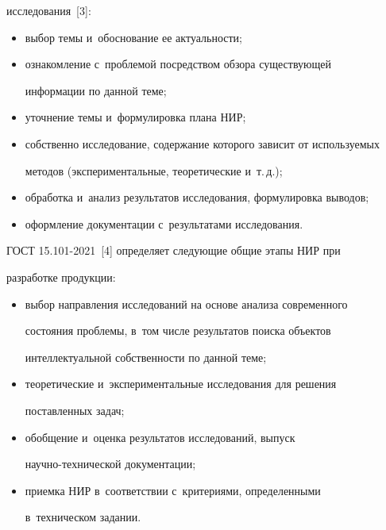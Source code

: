 исследования~[3]:


  \begin{itemize}


\item выбор темы и~обоснование ее ак\-ту\-аль\-ности;


\item ознакомление с~проблемой посредством обзора су\-щест\-ву\-ющей 


информации по данной \mbox{теме};


\item уточнение темы и~формулировка плана   НИР;


\item собственно исследование, содержание которого зависит от ис\-поль\-зу\-емых 


методов (экспериментальные, тео\-ре\-ти\-че\-ские и~т.\,д.);


\item обработка и~анализ результатов исследования, формулировка выводов;


\item оформление документации с~результатами исследования.


\end{itemize}


  


  ГОСТ 15.101-2021~[4] определяет сле\-ду\-ющие общие этапы НИР при 


разработке продукции:


  \begin{itemize}


\item выбор направления исследований на основе анализа современного  


со\-сто\-яния проб\-ле\-мы, в~том числе результатов поиска объектов 


интеллектуальной собственности по данной \mbox{теме};


\item теоретические и~экспериментальные исследования для решения 


поставленных задач;


\item обобщение и~оценка результатов исследований, выпуск  


на\-уч\-но-тех\-ни\-че\-ской документации;


\item приемка НИР в~соответствии с~критериями, определенными 


в~техническом задании.


\end{itemize}



